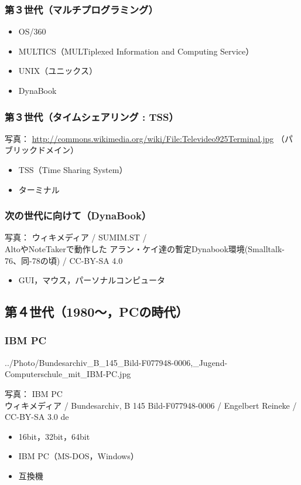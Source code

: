 \documentclass[nomag]{beamer}                   %
\begin{document}
\begin{frame}
  \frametitle{第３世代（マルチプログラミング）}
  \begin{itemize}
    \item OS/360
    \item MULTICS（MULTiplexed Information and Computing Service）
    \item UNIX（ユニックス）
    \item DynaBook
  \end{itemize}
\end{frame}

\begin{frame}
  \frametitle{第３世代（タイムシェアリング : TSS）}
  \centerline{\tiny 写真：
      \url{http://commons.wikimedia.org/wiki/File:Televideo925Terminal.jpg}
（パブリックドメイン）}
  \begin{itemize}
    \item TSS（Time Sharing System）
    \item ターミナル
  \end{itemize}
\end{frame}

\begin{frame}
  \frametitle{次の世代に向けて（DynaBook）}
  \begin{center}
  {\tiny 写真： ウィキメディア /  SUMIM.ST / \\
    AltoやNoteTakerで動作した
    アラン・ケイ達の暫定Dynabook環境(Smalltalk-76、同-78の頃) /
    CC-BY-SA 4.0}
  \end{center}
  \begin{itemize}
    \item GUI，マウス，パーソナルコンピュータ
  \end{itemize}
\end{frame}

\subsection{第４世代（1980〜，PCの時代）}
\begin{frame}
  \frametitle{IBM PC}
{../Photo/Bundesarchiv_B_145_Bild-F077948-0006,_Jugend-Computerschule_mit_IBM-PC.jpg}
      {\tiny
        \begin{center}
          写真： IBM PC \\
          ウィキメディア /
          Bundesarchiv, B 145 Bild-F077948-0006 /
          Engelbert Reineke / CC-BY-SA 3.0 de
        \end{center}
      }
  \begin{itemize}
    \item 16bit，32bit，64bit
    \item IBM PC（MS-DOS，Windows）
    \item 互換機
  \end{itemize}
\end{frame}
\end{document}
